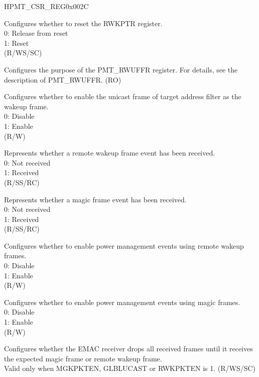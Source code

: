 \begin{register}{H}{PMT\_CSR\_REG}{0x002C}\label{regdesc:PMTCSRREG}
%
%
%
%
%
%
%
%
%
%
%
%
\regnewline%
\begin{regdesc}\begin{reglist}
\item [RWKFILTRST] Configures whether to reset the RWKPTR register.\\
0: Release from reset\\
1: Reset\\ (R/WS/SC)
\item [RWKPTR] Configures the purpose of the PMT\_RWUFFR register. For details, see the description of PMT\_RWUFFR. (RO)
\item [GLBLUCAST] Configures whether to enable the unicast frame of target address filter as the wakeup frame.\\
0: Disable\\
1: Enable\\ (R/W)
\item [RWKPRCVD] Represents whether a remote wakeup frame event has been received.\\
0: Not received\\
1: Received\\ (R/SS/RC)
\item [MGKPRCVD]  Represents whether a magic frame event has been received.\\
0: Not received\\
1: Received\\ (R/SS/RC)
\item [RWKPKTEN] Configures whether to enable power management events using remote wakeup frames.\\
0: Disable\\
1: Enable\\ (R/W)
\item [MGKPKTEN] Configures whether to enable power management events using magic frames.\\
0: Disable\\
1: Enable\\(R/W)
\item [PWRDWN] Configures whether the EMAC receiver drops all received frames until it receives the expected magic frame or remote wakeup frame.\\
Valid only when MGKPKTEN, GLBLUCAST or RWKPKTEN is 1. (R/WS/SC)


\end{reglist}\end{regdesc}
\end{register}


